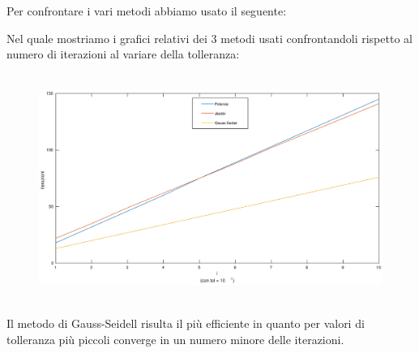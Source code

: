 \begin{flushleft}
Per confrontare i vari metodi abbiamo usato il seguente:


Nel quale mostriamo i grafici relativi dei 3 metodi usati confrontandoli rispetto al numero di iterazioni al variare della tolleranza:
\begin{figure}[H]
\includegraphics[width=480px, height=280px]{plot/fes56}
\end{figure}
Il metodo di Gauss-Seidell risulta il più efficiente in quanto per valori di tolleranza più piccoli converge in un numero minore delle iterazioni.
\end{flushleft}